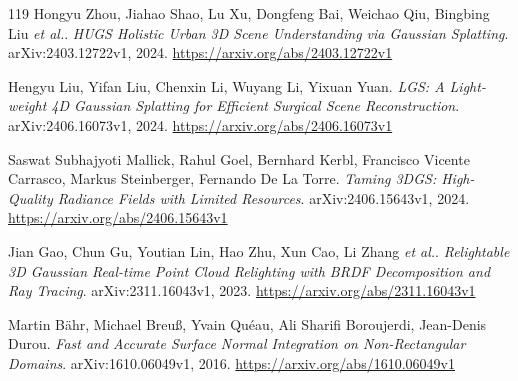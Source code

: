 \documentclass[11pt,a4paper]{article}
\begin{document}
\begin{thebibliography}{119}
Hongyu Zhou, Jiahao Shao, Lu Xu, Dongfeng Bai, Weichao Qiu, Bingbing Liu \emph{et al.}.
\newblock \emph{HUGS Holistic Urban 3D Scene Understanding via Gaussian Splatting}.
\newblock arXiv:2403.12722v1, 2024.
\newblock \url{https://arxiv.org/abs/2403.12722v1}

Hengyu Liu, Yifan Liu, Chenxin Li, Wuyang Li, Yixuan Yuan.
\newblock \emph{LGS: A Light-weight 4D Gaussian Splatting for Efficient Surgical Scene Reconstruction}.
\newblock arXiv:2406.16073v1, 2024.
\newblock \url{https://arxiv.org/abs/2406.16073v1}

Saswat Subhajyoti Mallick, Rahul Goel, Bernhard Kerbl, Francisco Vicente Carrasco, Markus Steinberger, Fernando De La Torre.
\newblock \emph{Taming 3DGS: High-Quality Radiance Fields with Limited Resources}.
\newblock arXiv:2406.15643v1, 2024.
\newblock \url{https://arxiv.org/abs/2406.15643v1}

Jian Gao, Chun Gu, Youtian Lin, Hao Zhu, Xun Cao, Li Zhang \emph{et al.}.
\newblock \emph{Relightable 3D Gaussian Real-time Point Cloud Relighting with BRDF Decomposition and Ray Tracing}.
\newblock arXiv:2311.16043v1, 2023.
\newblock \url{https://arxiv.org/abs/2311.16043v1}

Martin B\"{a}hr, Michael Breu\ss{}, Yvain Qu\'{e}au, Ali Sharifi Boroujerdi, Jean-Denis Durou.
\newblock \emph{Fast and Accurate Surface Normal Integration on Non-Rectangular Domains}.
\newblock arXiv:1610.06049v1, 2016.
\newblock \url{https://arxiv.org/abs/1610.06049v1}

\end{thebibliography}
\end{document}
